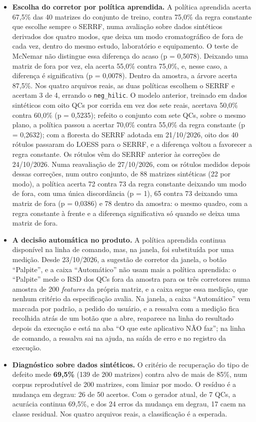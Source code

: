 \begin{itemize}
\item \textbf{Escolha do corretor por política aprendida.} A política aprendida acerta 67,5\% das 40 matrizes do conjunto de treino, contra 75,0\% da regra constante que escolhe sempre o SERRF, numa avaliação sobre dados sintéticos derivados dos quatro modos, que deixa um modo cromatográfico de fora de cada vez, dentro do mesmo estudo, laboratório e equipamento. O teste de McNemar não distingue essa diferença do acaso (p = 0,5078). Deixando uma matriz de fora por vez, ela acerta 55,0\% contra 75,0\%, e, nesse caso, a diferença é significativa (p = 0,0078). Dentro da amostra, a árvore acerta 87,5\%. Nos quatro arquivos reais, as duas políticas escolhem o SERRF e acertam 3 de 4, errando o \texttt{neg\_\allowbreak{}hilic}. O modelo anterior, treinado em dados sintéticos com oito QCs por corrida em vez dos sete reais, acertava 50,0\% contra 60,0\% (p = 0,5235); refeito o conjunto com sete QCs, sobre o mesmo plano, a política passou a acertar 70,0\% contra 55,0\% da regra constante (p = 0,2632); com a floresta do SERRF adotada em 21/10/2026, oito dos 40 rótulos passaram do LOESS para o SERRF, e a diferença voltou a favorecer a regra constante. Os rótulos vêm do SERRF anterior às correções de 24/10/2026. Numa reavaliação de 27/10/2026, com os rótulos medidos depois dessas correções, num outro conjunto, de 88 matrizes sintéticas (22 por modo), a política acerta 72 contra 73 da regra constante deixando um modo de fora, com uma única discordância (p = 1), 65 contra 73 deixando uma matriz de fora (p = 0,0386) e 78 dentro da amostra: o mesmo quadro, com a regra constante à frente e a diferença significativa só quando se deixa uma matriz de fora.
\item \textbf{A decisão automática no produto.} A política aprendida continua disponível na linha de comando, mas, na janela, foi substituída por uma medição. Desde 23/10/2026, a sugestão de corretor da janela, o botão ``Palpite'', e a caixa ``Automático'' não usam mais a política aprendida: o ``Palpite'' mede o RSD dos QCs fora da amostra para os três corretores numa amostra de 200 \textit{features} da própria matriz, e a caixa segue essa medição, que nenhum critério da especificação avalia. Na janela, a caixa ``Automático'' vem marcada por padrão, a pedido do usuário, e a ressalva com a medição fica recolhida atrás de um botão que a abre, reaparece na linha do resultado depois da execução e está na aba ``O que este aplicativo NÃO faz''; na linha de comando, a ressalva sai na ajuda, na saída de erro e no registro da execução.
\item \textbf{Diagnóstico sobre dados sintéticos.} O critério de recuperação do tipo de defeito mede \textbf{69,5\%} (139 de 200 matrizes) contra alvo de mais de 85\%, num corpus reprodutível de 200 matrizes, com limiar por modo. O resíduo é a mudança em degrau: 26 de 50 acertos. Com o gerador atual, de 7 QCs, a acurácia continua 69,5\%, e dos 24 erros da mudança em degrau, 17 caem na classe residual. Nos quatro arquivos reais, a classificação é a esperada.
\end{itemize}

